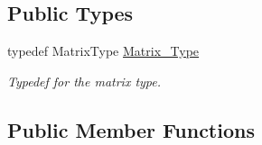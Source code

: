 \subsection*{Public Types}
\begin{DoxyCompactItemize}
\item 
typedef Matrix\+Type \hyperlink{classFVCode3D_1_1Problem_a91f0670813837256bdc1c149fdcc1fd5}{Matrix\+\_\+\+Type}
\begin{DoxyCompactList}\small\item\em Typedef for the matrix type. \end{DoxyCompactList}\end{DoxyCompactItemize}
\subsection*{Public Member Functions}
